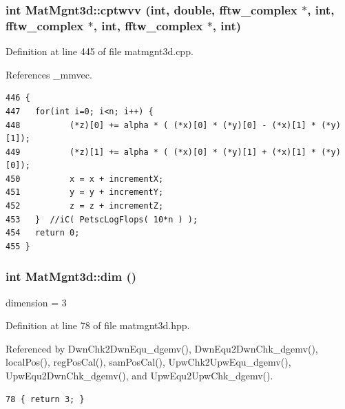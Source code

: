 \subsubsection{\setlength{\rightskip}{0pt plus 5cm}int Mat\-Mgnt3d::cptwvv (int, double, fftw\_\-complex $\ast$, int, fftw\_\-complex $\ast$, int, fftw\_\-complex $\ast$, int)\hspace{0.3cm}{\tt  [inline]}}\label{classMatMgnt3d_a81bf8ce3d0c283d3bf63cae00ae99e6_a81bf8ce3d0c283d3bf63cae00ae99e6}




Definition at line 445 of file matmgnt3d.cpp.

References \_\-mmvec.

\footnotesize\begin{verbatim}446 {
447   for(int i=0; i<n; i++) {
448          (*z)[0] += alpha * ( (*x)[0] * (*y)[0] - (*x)[1] * (*y)[1]);
449          (*z)[1] += alpha * ( (*x)[0] * (*y)[1] + (*x)[1] * (*y)[0]);
450          x = x + incrementX;
451          y = y + incrementY;
452          z = z + incrementZ;
453   }  //iC( PetscLogFlops( 10*n ) );
454   return 0;
455 }
\end{verbatim}\normalsize 


\subsubsection{\setlength{\rightskip}{0pt plus 5cm}int Mat\-Mgnt3d::dim ()\hspace{0.3cm}{\tt  [inline]}}\label{classMatMgnt3d_e3f9953141ca7d7525b58c0ff1ef6b1f_e3f9953141ca7d7525b58c0ff1ef6b1f}


dimension = 3 

Definition at line 78 of file matmgnt3d.hpp.

Referenced by Dwn\-Chk2Dwn\-Equ\_\-dgemv(), Dwn\-Equ2Dwn\-Chk\_\-dgemv(), local\-Pos(), reg\-Pos\-Cal(), sam\-Pos\-Cal(), Upw\-Chk2Upw\-Equ\_\-dgemv(), Upw\-Equ2Dwn\-Chk\_\-dgemv(), and Upw\-Equ2Upw\-Chk\_\-dgemv().

\footnotesize\begin{verbatim}78 { return 3; }
\end{verbatim}\normalsize 



